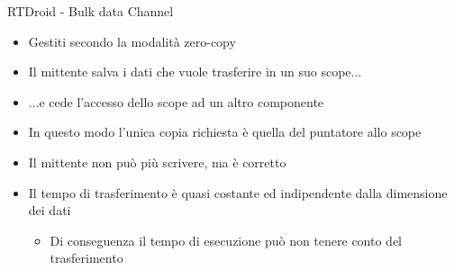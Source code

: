 \begin{frame}{RTDroid - Bulk data Channel}
	\begin{itemize}
		\item Gestiti secondo la modalità zero-copy
		\item Il mittente salva i dati che vuole trasferire in un suo scope...
		\item ...e cede l'accesso dello scope ad un altro componente
		\item In questo modo l'unica copia richiesta è quella del puntatore allo scope
		\item Il mittente non può più scrivere, ma è corretto
		\item Il tempo di trasferimento è quasi costante ed indipendente dalla dimensione dei dati
		\begin{itemize}
			\item Di conseguenza il tempo di esecuzione può non tenere conto del trasferimento
		\end{itemize}
	\end{itemize}
\end{frame}